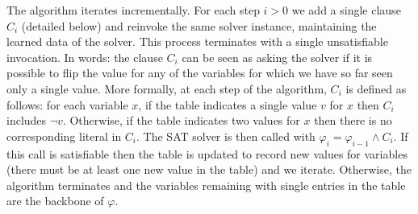 \documentclass[runningheads,a4paper]{llncs}
\begin{document}
The algorithm iterates incrementally. For each step $i>0$ we add a
single clause $C_i$ (detailed below) and reinvoke the same solver
instance, maintaining the learned data of the solver. This process
terminates with a single unsatisfiable invocation. In words: the
clause $C_i$ can be seen as asking the solver if it is possible to
flip the value for any of the variables for which we have so far seen
only a single value.
More formally, at each step of the algorithm, $C_i$ is defined as
follows: for each variable $x$, if the table indicates a single value
$v$ for $x$ then $C_i$ includes $\neg v$. Otherwise, if the table
indicates two values for $x$ then there is no corresponding literal in
$C_i$. The SAT solver is then called with $\varphi_i =
\varphi_{i-1}\wedge C_i$. If this call is satisfiable then the table
is updated to record new values for variables (there must be at least
one new value in the table) and we iterate. Otherwise, the algorithm
terminates and the variables remaining with single entries in the
table are the backbone of $\varphi$.
\end{document}

